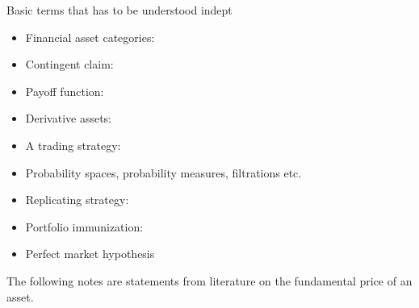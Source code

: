 Basic terms that has to be understood indept 
    \begin{itemize}
        \item Financial asset categories:  
        \item Contingent claim:
        \item Payoff function:
        \item Derivative assets:
        \item A trading strategy: 
        \item Probability spaces, probability measures, filtrations etc. 
        \item Replicating strategy: 
        \item Portfolio immunization: 
        \item Perfect market hypothesis 
    \end{itemize}
\noindent
    The following notes are statements from literature on the fundamental price of an asset. 
    

